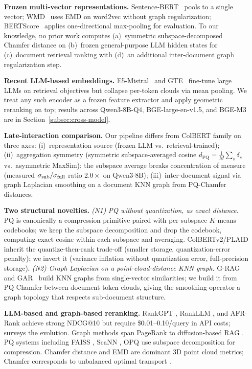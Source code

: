 \documentclass[review,1p]{elsarticle}
\begin{document}
\textbf{Frozen multi-vector representations.} Sentence-BERT~\citep{reimers2019sbert} pools to a single vector; WMD~\citep{kusner2015wmd} uses EMD on word2vec without graph regularization; BERTScore~\citep{zhang2020bertscore} applies one-directional max-pooling for evaluation. To our knowledge, no prior work computes (a)~symmetric subspace-decomposed Chamfer distance on (b)~frozen general-purpose LLM hidden states for (c)~document retrieval ranking with (d)~an additional inter-document graph regularization step.

\textbf{Recent LLM-based embeddings.} E5-Mistral~\citep{wang2024e5mistral} and GTE~\citep{li2024gte} fine-tune large LLMs on retrieval objectives but collapse per-token clouds via mean pooling. We treat any such encoder as a frozen feature extractor and apply geometric reranking on top; results across Qwen3-8B-Q4, BGE-large-en-v1.5, and BGE-M3 are in Section~\ref{subsec:cross-model}.

\textbf{Late-interaction comparison.} Our pipeline differs from ColBERT family on three axes: (i)~representation source (frozen LLM vs.\ retrieval-trained); (ii)~aggregation symmetry (symmetric subspace-averaged cosine $d_{\mathrm{PQ}} = \tfrac{1}{M}\sum_s \delta_s$ vs.\ asymmetric MaxSim); the subspace average breaks concentration of measure (measured $\sigma_{\rm sub}/\sigma_{\rm full}$ ratio $2.0\times$ on Qwen3-8B); (iii)~inter-document signal via graph Laplacian smoothing on a document KNN graph from PQ-Chamfer distances.

\textbf{Two structural novelties.} \emph{(N1) PQ without quantization, as exact distance.} PQ \citep{jegou2011pq} is canonically a compression primitive paired with per-subspace $K$-means codebooks; we keep the subspace decomposition and drop the codebook, computing exact cosine within each subspace and averaging. ColBERTv2/PLAID inherit the quantize-then-rank trade-off (smaller storage, quantization-error penalty); we invert it (variance inflation without quantization error, full-precision storage). \emph{(N2) Graph Laplacian on a point-cloud-distance KNN graph.} G-RAG~\citep{glass2024grag} and GAR~\citep{macavaney2022gar} build KNN graphs from single-vector similarities; we build it from PQ-Chamfer between document token clouds, giving the smoothing operator a graph topology that respects sub-document structure.

\textbf{LLM-based and graph-based reranking.} RankGPT \citep{sun2024rankgpt}, RankLLM \citep{pradeep2025rankllm}, and AFR-Rank \citep{afrrank2025} achieve strong NDCG@10 but require \$0.01--0.10/query in API costs; \citep{li2025reranking_survey} surveys the evolution. Graph methods span PageRank \citep{page1999pagerank} to diffusion-based RAG \citep{dampanaboina2024diffrag}. PQ systems including FAISS \citep{johnson2021faiss}, ScaNN \citep{guo2020scann}, OPQ \citep{ge2014opq} use subspace decomposition for compression. Chamfer distance \citep{fan2017chamfer} and EMD \citep{rubner2000emd} are dominant 3D point cloud metrics; Chamfer corresponds to unbalanced optimal transport \citep{sejourne2023uot}.
\end{document}
